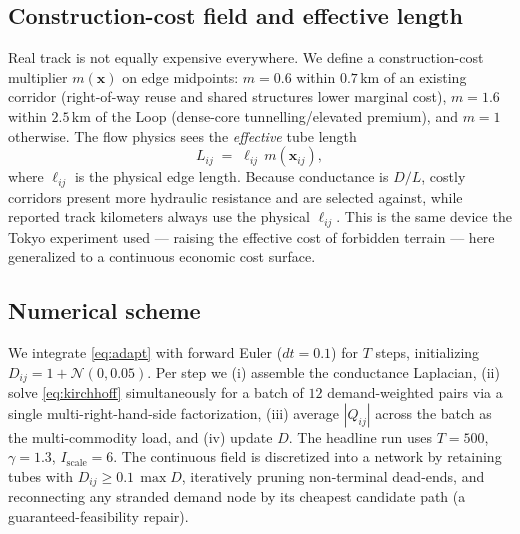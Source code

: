 \documentclass[11pt]{article}
\newcommand{\D}{D}
\begin{document}
\subsection{Construction-cost field and effective length}
Real track is not equally expensive everywhere. We define a construction-cost multiplier
$m(\mathbf{x})$ on edge midpoints: $m=0.6$ within $0.7$\,km of an existing corridor
(right-of-way reuse and shared structures lower marginal cost), $m=1.6$ within $2.5$\,km of
the Loop (dense-core tunnelling/elevated premium), and $m=1$ otherwise. The flow physics
sees the \emph{effective} tube length
\begin{equation}
L_{ij} \;=\; \ell_{ij}\, m(\mathbf{x}_{ij}),
\label{eq:Leff}
\end{equation}
where $\ell_{ij}$ is the physical edge length. Because conductance is $\D/L$, costly
corridors present more hydraulic resistance and are selected against, while reported track
kilometers always use the physical $\ell_{ij}$. This is the same device the Tokyo
experiment used --- raising the effective cost of forbidden terrain --- here generalized to
a continuous economic cost surface.

\subsection{Numerical scheme}
We integrate \eqref{eq:adapt} with forward Euler ($dt=0.1$) for $T$ steps, initializing
$\D_{ij}=1+\mathcal{N}(0,0.05)$. Per step we (i) assemble the conductance Laplacian, (ii)
solve \eqref{eq:kirchhoff} simultaneously for a batch of $12$ demand-weighted pairs via a
single multi-right-hand-side factorization, (iii) average $|Q_{ij}|$ across the batch as the
multi-commodity load, and (iv) update $\D$. The headline run uses $T=500$, $\gamma=1.3$,
$I_{\text{scale}}=6$. The continuous field is discretized into a network by retaining tubes
with $\D_{ij}\ge 0.1\,\max\D$, iteratively pruning non-terminal dead-ends, and reconnecting
any stranded demand node by its cheapest candidate path (a guaranteed-feasibility repair).
\end{document}
